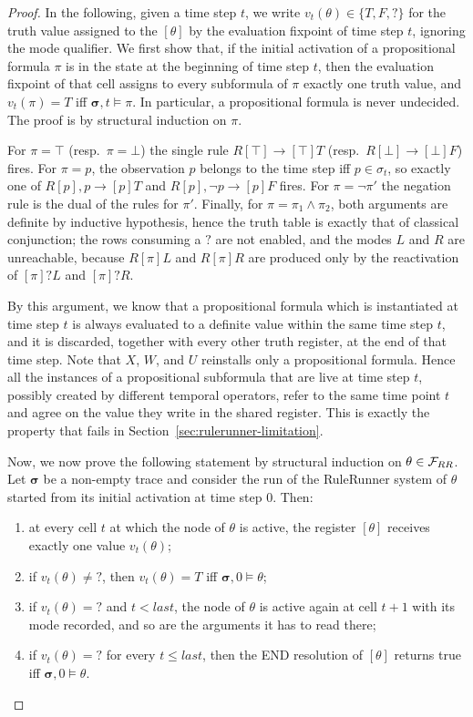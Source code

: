 \begin{proof}
In the following, given a time step $t$, we write $v_t(\theta) \in \{T,F,?\}$ for the truth value assigned to the $[\theta]$ by the evaluation fixpoint of time step $t$, ignoring the mode qualifier.
%
We first show that, if the initial activation of a propositional formula $\pi$ is in the state at the beginning of time step $t$, then the evaluation fixpoint of that cell assigns to every subformula of $\pi$ exactly one truth value, and $v_t(\pi) = T$ iff $\boldsymbol{\sigma},t\models\pi$. In particular, a propositional formula is never undecided. The proof is by structural induction on $\pi$.

For $\pi = \top$ (resp.\ $\pi = \bot$) the single rule $R[\top]\rightarrow[\top]T$ (resp.\ $R[\bot]\rightarrow[\bot]F$) fires. For $\pi = p$, the observation $p$ belongs to the time step iff $p \in \sigma_t$, so exactly one of $R[p],p \rightarrow [p]T$ and
$R[p],\lnot p \rightarrow [p]F$ fires. For $\pi = \lnot\pi'$ the negation
rule is the dual of the rules for $\pi'$. Finally, for $\pi = \pi_1\land\pi_2$, both
arguments are definite by inductive hypothesis, hence the truth table is exactly that of classical conjunction; the rows consuming a $?$ are not enabled, and the modes $L$ and $R$ are
unreachable, because $R[\pi]L$ and $R[\pi]R$ are produced only by the reactivation of $[\pi]?L$ and $[\pi]?R$.

By this argument, we know that a propositional formula which is instantiated at time step $t$ is always evaluated to a definite value within the same time step $t$, and it is discarded, together with every other truth register, at the end of that time step. Note that $X$, $W$, and $U$ reinstalls only a propositional formula. Hence all the instances of a propositional subformula that
are live at time step $t$, possibly created by different temporal operators, refer
to the same time point $t$ and agree on the value they write in the shared
register. This is exactly the property that fails in
Section~\ref{sec:rulerunner-limitation}.

Now, we now prove the following statement by structural induction on
$\theta\in{\ensuremath{\mathcal{F}}}_{RR}$. Let $\boldsymbol{\sigma}$ be a non-empty trace and consider
the run of the RuleRunner system of $\theta$ started from its initial activation
at time step $0$. Then:
\begin{enumerate}
    \item[(i)] at every cell $t$ at which the node of $\theta$ is active, the register $[\theta]$ receives exactly one value $v_t(\theta)$;
    \item[(ii)] if $v_t(\theta)\neq{?}$, then $v_t(\theta)=T$ iff $\boldsymbol{\sigma},0\models\theta$;
    \item[(iii)] if $v_t(\theta)={?}$ and $t<last$, the node of $\theta$ is active again at cell $t+1$ with its mode recorded, and so are the arguments it has to read there;
    \item[(iv)] if $v_t(\theta)={?}$ for every $t\leq last$, then the END resolution of $[\theta]$ returns true iff $\boldsymbol{\sigma},0\models\theta$.
\end{enumerate}


\end{proof}
